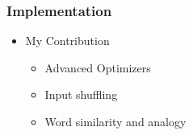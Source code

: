 \begin{frame}\frametitle{Implementation}
\begin{itemize}
\item My Contribution
\begin{itemize}
\item Advanced Optimizers
\item Input shuffling
\item Word similarity and analogy
\end{itemize}
\end{itemize}
\end{frame}